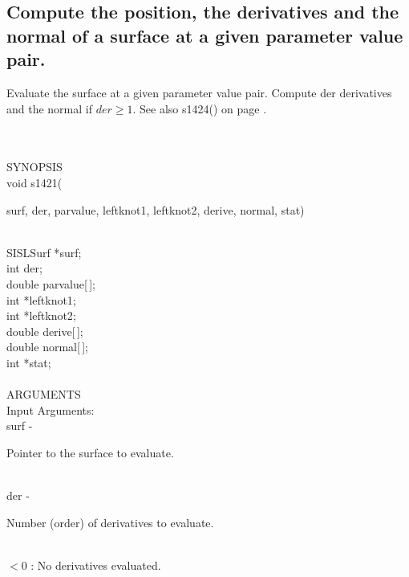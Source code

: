 \subsection{Compute the position, the derivatives and the normal of a
surface at a given parameter value pair.}
\begin{minipg1}
  Evaluate the surface at a given parameter value pair.
  Compute {\fov der} derivatives and the normal if $der \geq 1$.
  See also s1424() on page \pageref{s1424}.
\end{minipg1} \\ \\
SYNOPSIS\\
        \>void s1421(\begin{minipg3}
          {\fov surf}, {\fov der}, {\fov parvalue}, {\fov leftknot1}, {\fov leftknot2}, {\fov derive}, {\fov normal}, {\fov stat})
        \end{minipg3}\\[0.3ex]
        \>\>    SISLSurf        \>      *{\fov surf};\\
        \>\>    int     \>      {\fov der};\\
        \>\>    double  \>      {\fov parvalue}[\,];\\
        \>\>    int     \>      *{\fov leftknot1};\\
        \>\>    int     \>      *{\fov leftknot2};\\
        \>\>    double  \>      {\fov derive}[\,];\\
        \>\>    double  \>      {\fov normal}[\,];\\
        \>\>    int     \>      *{\fov stat};\\
\\
ARGUMENTS\\
        \>Input Arguments:\\
        \>\>    {\fov surf}\> - \>              \begin{minipg2}
                                Pointer to the surface to evaluate.
                                \end{minipg2}\\
        \>\>    {\fov der}\> - \>               \begin{minipg2}
                                Number (order) of derivatives to evaluate.
                                \end{minipg2}\\
                \>\>\>\>\>      $< 0$ \> : No derivatives evaluated.\\
